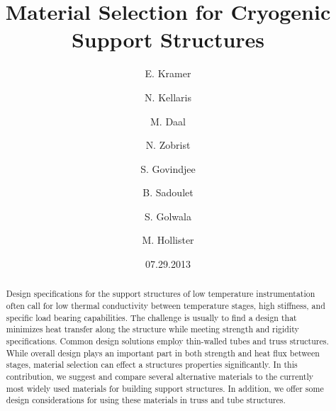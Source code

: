 \documentclass[final]{svjour2}
\begin{document}
\newcommand{\hdblarrow}{H\makebox[0.9ex][l]{$\downdownarrows$}-}
\title{Material Selection for Cryogenic Support Structures}

\author{E. Kramer \and N. Kellaris  \and M. Daal \and N. Zobrist \and S. Govindjee \and B. Sadoulet \and S. Golwala \and M. Hollister}


\date{07.29.2013}

\maketitle

\begin{abstract}

Design specifications for the support structures of low temperature instrumentation often call for low thermal conductivity between temperature stages, high stiffness, and specific load bearing capabilities. The challenge is usually to find a design that minimizes heat transfer along the structure while meeting strength and rigidity specifications.  Common design solutions employ thin-walled tubes and truss structures.  While overall design plays an important part in both strength and heat flux between stages, material selection can effect a structures properties significantly.  In this contribution, we suggest and compare several alternative materials to the currently most widely used materials for building support structures. In addition, we offer some design considerations for using these materials in truss and tube structures.


\end{abstract}
\end{document}
